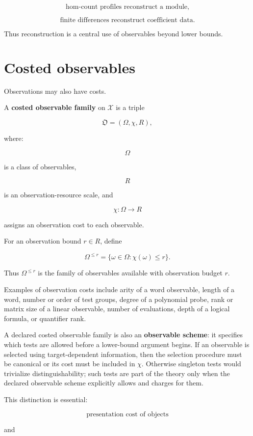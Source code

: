 \documentclass[11pt]{article}
\begin{document}
\[
\text{hom-count profiles reconstruct a module,}
\]

\[
\text{finite differences reconstruct coefficient data.}
\]

Thus reconstruction is a central use of observables beyond lower bounds.


\section{Costed observables}

Observations may also have costs.

A \textbf{costed observable family} on \(\mathcal X\) is a triple

\[
\mathfrak O=(\Omega,\chi,R),
\]

where:

\[
\Omega
\]

is a class of observables,

\[
R
\]

is an observation-resource scale, and

\[
\chi:\Omega\to R
\]

assigns an observation cost to each observable.

For an observation bound \(r\in R\), define

\[
\Omega^{\leq r}=\{\omega\in\Omega:\chi(\omega)\leq r\}.
\]

Thus \(\Omega^{\leq r}\) is the family of observables available with observation budget \(r\).

Examples of observation costs include arity of a word observable, length of a word, number or order of test groups, degree of a polynomial probe, rank or matrix size of a linear observable, number of evaluations, depth of a logical formula, or quantifier rank.

A declared costed observable family is also an \textbf{observable scheme}: it specifies which tests are allowed before a lower-bound argument begins. If an observable is selected using target-dependent information, then the selection procedure must be canonical or its cost must be included in \(\chi\). Otherwise singleton tests would trivialize distinguishability; such tests are part of the theory only when the declared observable scheme explicitly allows and charges for them.

This distinction is essential:

\[
\text{presentation cost of objects}
\]

and
\end{document}
